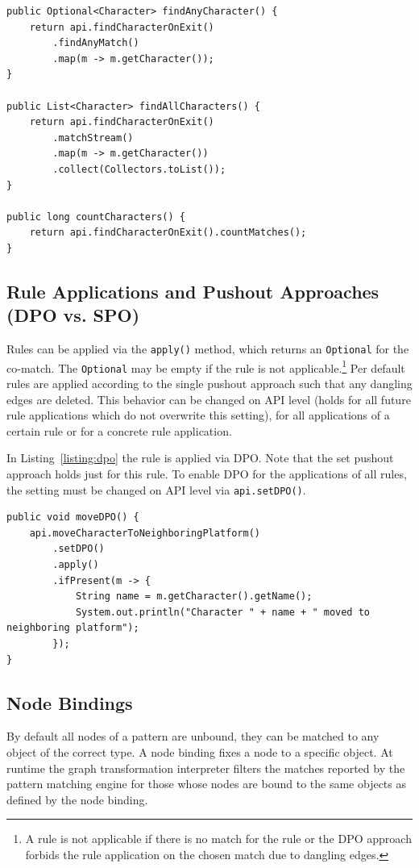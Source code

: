 \begin{lstlisting}[caption={Model Queries}, label={listing:model-queries}]
public Optional<Character> findAnyCharacter() {
	return api.findCharacterOnExit()
		.findAnyMatch()
		.map(m -> m.getCharacter());
}

public List<Character> findAllCharacters() {
	return api.findCharacterOnExit()
		.matchStream()
		.map(m -> m.getCharacter())
		.collect(Collectors.toList());
}

public long countCharacters() {
	return api.findCharacterOnExit().countMatches();
}
\end{lstlisting}

\subsection{Rule Applications and Pushout Approaches (DPO vs. SPO)}
\label{api-pushout-approaches}
Rules can be applied via the \texttt{apply()} method, which returns an \texttt{Optional} for the co-match.
The \texttt{Optional} may be empty if the rule is not applicable.\footnote{A rule is not applicable if there is no match for the rule or the DPO approach forbids the rule application on the chosen match due to dangling edges.}
Per default rules are applied according to the single pushout approach such that any dangling edges are deleted.
This behavior can be changed on API level (holds for all future rule applications which do not overwrite this setting), for all applications of a certain rule or for a concrete rule application.

In Listing~\ref{listing:dpo} the rule is applied via DPO.
Note that the set pushout approach holds just for this rule.
To enable DPO for the applications of all rules, the setting must be changed on API level via \texttt{api.setDPO()}.

\begin{lstlisting}[caption={Usage of DPO for a Single Rule Application}, label={listing:dpo}]
public void moveDPO() {
	api.moveCharacterToNeighboringPlatform()
		.setDPO()
		.apply()
		.ifPresent(m -> {
			String name = m.getCharacter().getName();
			System.out.println("Character " + name + " moved to neighboring platform");
		});
}
\end{lstlisting}

\subsection{Node Bindings}
\label{api-node-bindings}
By default all nodes of a pattern are unbound, \ie they can be matched to any object of the correct type.
A node binding fixes a node to a specific object.
At runtime the graph transformation interpreter filters the matches reported by the pattern matching engine for those whose nodes are bound to the same objects as defined by the node binding.

